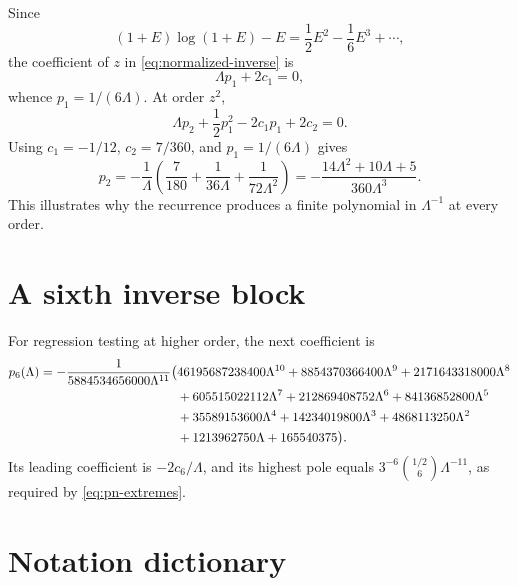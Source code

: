 \documentclass[11pt,oneside]{article}
\theoremstyle{plain}
\theoremstyle{definition}
\theoremstyle{remark}
\begin{document}
Since
\begin{equation}
 (1+E)\log(1+E)-E=\frac12E^2-\frac16E^3+\cdots,
 \label{eq:kernel-hand}
\end{equation}
the coefficient of \(z\) in \cref{eq:normalized-inverse} is
\[
 \Lambda p_1+2c_1=0,
\]
whence \(p_1=1/(6\Lambda)\).  At order \(z^2\),
\begin{equation}
 \Lambda p_2+\frac12p_1^2-2c_1p_1+2c_2=0.
 \label{eq:p2-hand-equation}
\end{equation}
Using \(c_1=-1/12\), \(c_2=7/360\), and \(p_1=1/(6\Lambda)\) gives
\[
 p_2=-\frac1\Lambda\left(
 \frac7{180}+\frac1{36\Lambda}+\frac1{72\Lambda^2}\right)
 =-\frac{14\Lambda^2+10\Lambda+5}{360\Lambda^3}.
\]
This illustrates why the recurrence produces a finite polynomial in
\(\Lambda^{-1}\) at every order.

\section{A sixth inverse block}
\label{app:p6}

For regression testing at higher order, the next coefficient is
\begin{align}
 p_6(\Lambda)=-\frac1{5884534656000\Lambda^{11}}
 \bigl({}&46195687238400\Lambda^{10}
 +8854370366400\Lambda^9
 +2171643318000\Lambda^8
 \notag\\
 &+605515022112\Lambda^7
 +212869408752\Lambda^6
 +84136852800\Lambda^5
 \notag\\
 &+35589153600\Lambda^4
 +14234019800\Lambda^3
 +4868113250\Lambda^2
 \notag\\
 &+1213962750\Lambda+165540375\bigr).
 \label{eq:p6}
\end{align}
Its leading coefficient is \(-2c_6/\Lambda\), and its highest pole equals
\(3^{-6}\binom{1/2}{6}\Lambda^{-11}\), as required by
\cref{eq:pn-extremes}.

\section{Notation dictionary}
\label{app:notation}
\end{document}
